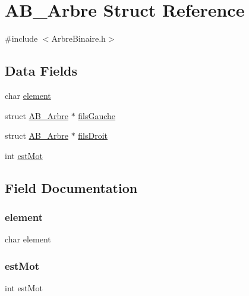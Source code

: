 \hypertarget{struct_a_b___arbre}{}\section{A\+B\+\_\+\+Arbre Struct Reference}
\label{struct_a_b___arbre}


{\ttfamily \#include $<$Arbre\+Binaire.\+h$>$}

\subsection*{Data Fields}
\begin{DoxyCompactItemize}
\item 
char \hyperlink{struct_a_b___arbre_ae910a825e9334880562923c548841637}{element}
\item 
struct \hyperlink{struct_a_b___arbre}{A\+B\+\_\+\+Arbre} $\ast$ \hyperlink{struct_a_b___arbre_a083d0246e3cd80f6e7cc2ee406f6481c}{fils\+Gauche}
\item 
struct \hyperlink{struct_a_b___arbre}{A\+B\+\_\+\+Arbre} $\ast$ \hyperlink{struct_a_b___arbre_a0e147c049cd518a8ef737af42272b77e}{fils\+Droit}
\item 
int \hyperlink{struct_a_b___arbre_a766e9b8d6733658f5a2a5a0fe768e7aa}{est\+Mot}
\end{DoxyCompactItemize}


\subsection{Field Documentation}
\mbox{\label{struct_a_b___arbre_ae910a825e9334880562923c548841637}} 
\subsubsection{\texorpdfstring{element}{element}}
{\footnotesize\ttfamily char element}

\mbox{\label{struct_a_b___arbre_a766e9b8d6733658f5a2a5a0fe768e7aa}} 
\subsubsection{\texorpdfstring{est\+Mot}{estMot}}
{\footnotesize\ttfamily int est\+Mot}

